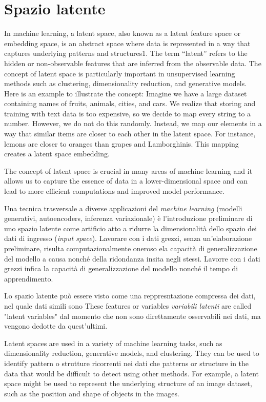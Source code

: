 \chapter{Spazio latente}

In machine learning, a latent space, also known as a latent feature space or embedding space, is an abstract space where data is represented in a way that captures underlying patterns and structures1.
The term “latent” refers to the hidden or non-observable features that are inferred from the observable data. 
The concept of latent space is particularly important in unsupervised learning methods such as clustering, dimensionality reduction, and generative models.
Here is an example to illustrate the concept: Imagine we have a large dataset containing names of fruits, animals, cities, and cars.
We realize that storing and training with text data is too expensive, so we decide to map every string to a number.
However, we do not do this randomly. Instead, we map our elements in a way that similar items are closer to each other in the latent space. 
For instance, lemons are closer to oranges than grapes and Lamborghinis. This mapping creates a latent space embedding.


The concept of latent space is crucial in many areas of machine learning and it allows us to capture the essence of data in a lower-dimensional space
and can lead to more efficient computations and improved model performance.

Una tecnica trasversale a diverse applicazioni del \emph{machine learning} (modelli generativi, autoencoders, inferenza variazionale) è l'introduzione 
preliminare di uno spazio latente come artificio atto a ridurre la dimensionalità dello spazio dei dati di ingresso (\emph{input space}).
Lavorare con i dati grezzi, senza un'elaborazione preliminare, risulta computazionalmente oneroso ela capacità di generalizzazione del modello a causa nonché della ridondanza insita negli stessi. 
Lavorre con i dati grezzi infica la capacità di generalizzazione del modello nonché il tempo di apprendimento.

Lo spazio latente può essere visto come una reppresntazione compressa dei dati, nel quale dati simili sono 
 These features or variables \emph{variabili latenti} are called "latent variables" dal momento che non sono direttamente osservabili nei dati, ma vengono dedotte da quest'ultimi. 

  Latent spaces are used in a variety of machine learning tasks, such as dimensionality reduction, generative models, and clustering. 
  They can be used to identify pattern o strutture ricorrenti nei dati che patterns or structure in the data that would be difficult to detect using other methods. 
For example, a latent space might be used to represent the underlying structure of an image dataset, such as the position and shape of objects in the images.


